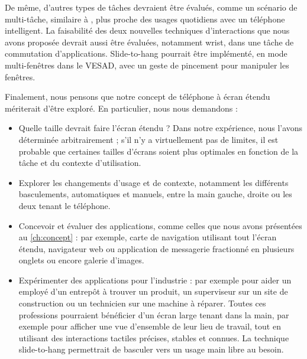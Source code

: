 De même, d'autres types de tâches devraient être évalués, comme un scénario de multi-tâche, similaire à \cite{Ens2014}, plus proche des usages quotidiens avec un téléphone intelligent. La faisabilité des deux nouvelles techniques d'interactions que nous avons proposée devrait aussi être évaluées, notamment wrist, dans une tâche de commutation d'applications. Slide-to-hang pourrait être implémenté, en mode multi-fenêtres dans le VESAD, avec un geste de pincement  pour manipuler les fenêtres.

Finalement, nous pensons que notre concept de téléphone à écran étendu mériterait d'être exploré. En particulier, nous nous demandons :
\begin{itemize}
  \item Quelle taille devrait faire l'écran étendu ? Dans notre expérience, nous l'avons déterminée arbitrairement ; s'il n'y a virtuellement pas de limites, il est probable que certaines tailles d'écrans soient plus optimales en fonction de la tâche et du contexte d'utilisation.
  \item Explorer les changements d'usage et de contexte, notamment les différents basculements, automatiques et manuels, entre la main gauche, droite ou les deux tenant le téléphone.
  \item Concevoir et évaluer des applications, comme celles que nous avons présentées au \autoref{ch:concept} : par exemple, carte de navigation utilisant tout l'écran étendu, navigateur web ou application de messagerie fractionné en plusieurs onglets ou encore galerie d'images.
  \item Expérimenter des applications pour l'industrie : par exemple pour aider un employé d'un entrepôt à trouver un produit, un superviseur sur un site de construction ou un technicien sur une machine à réparer. Toutes ces professions pourraient bénéficier d'un écran large tenant dans la main, par exemple pour afficher une vue d'ensemble de leur lieu de travail, tout en utilisant des interactions tactiles précises, stables et connues. La technique slide-to-hang permettrait de basculer vers un usage main libre au besoin.
\end{itemize}